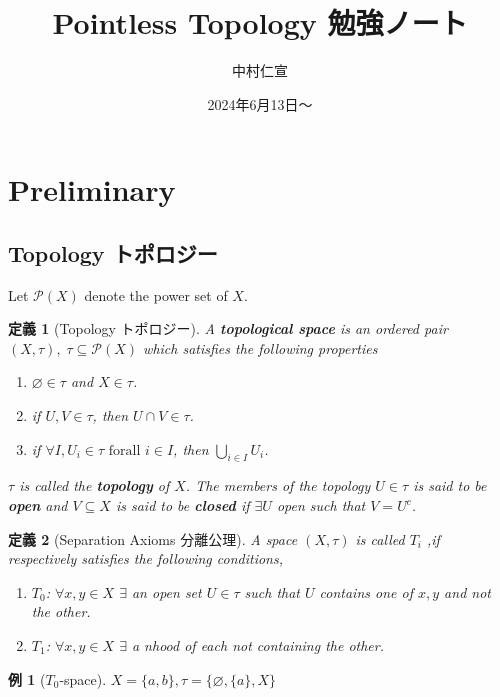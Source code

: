 \documentclass[a4j,12pt]{jarticle}
\numberwithin{equation}{section}
\newtheorem{example}{例}[section]
\newcommand{\itbf}[1]{\textit{\textbf{#1}}}
\newtheorem{dfn}{定義}[section]
\begin{document}
\title{Pointless Topology 勉強ノート}
\date{2024年6月13日〜}
\author{中村仁宣}
\maketitle

\section{Preliminary}
\subsection{Topology トポロジー}
Let $\mathcal{P}(X)$ denote the power set of $X$.
\begin{dfn}[Topology トポロジー]
  A \itbf{topological space} is an ordered pair $(X, \tau), \; \tau \subseteq \mathcal{P}(X)$ which satisfies the following properties
  \begin{enumerate}
  \item $\varnothing \in \tau$ and $X \in \tau$.
  \item if $U,V \in \tau$, then $U \cap V \in \tau$.
  \item if $\forall I, U_i \in \tau \text{ forall } i \in I$, then $\bigcup_{i\in I}U_i$.
  \end{enumerate}
  $\tau$ is called the \itbf{topology} of $X$.
  The members of the topology $U\in\tau$ is said to be \itbf{open} and $V \subseteq X$ is said to be \itbf{closed} if $\exists U$ open such that $V = U^c$.
\end{dfn}
\begin{dfn}[Separation Axioms 分離公理]
  A space $(X,\tau)$ is called $T_i$ ,if respectively satisfies the following conditions,
  \begin{enumerate}
  \item $T_0$: $\forall x,y \in X$ $\exists$ an open set $U \in \tau$ such that $U$ contains one of $x,y$ and not the other.
  \item $T_1$: $\forall x,y \in X$ $\exists$ a nhood of each not containing the other.
  \end{enumerate}
\end{dfn}
\begin{example}[$T_0$-space]
  $X=\{a,b\}, \tau=\{\varnothing, \{a\}, X\}$
\end{example}
\end{document}
